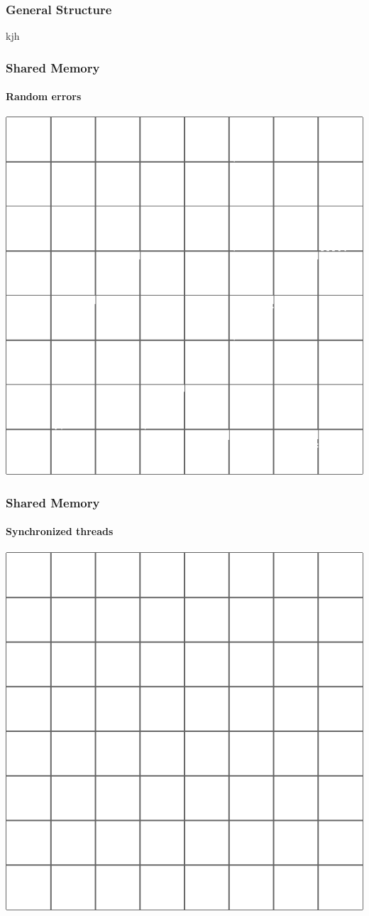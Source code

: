 \begin{frame}
\frametitle{General Structure}
kjh
\end{frame}

\begin{frame}
\frametitle{Shared Memory}
\framesubtitle{Random errors}
\begin{center}
\includegraphics[scale=0.4]{../check/borders_1c_01.png}
\end{center}
\end{frame}


\begin{frame}
\frametitle{Shared Memory}
\framesubtitle{Synchronized threads}
\begin{center}
\includegraphics[scale=0.4]{../check/borders_sync.png}
\end{center}
\end{frame}